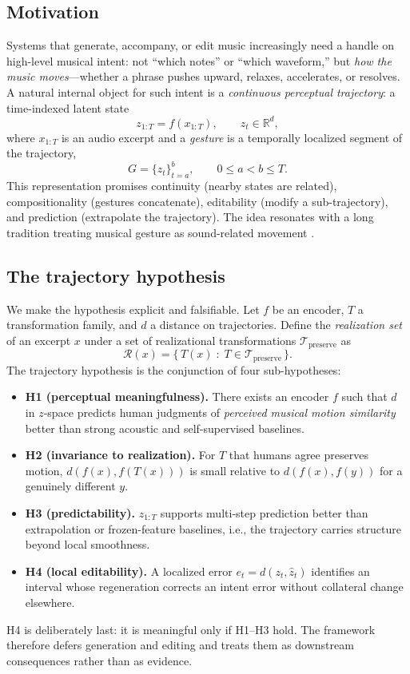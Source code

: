 \documentclass[11pt]{article}
\newcommand{\R}{\mathbb{R}}
\newcommand{\cT}{\mathcal{T}}
\newcommand{\cR}{\mathcal{R}}
\begin{document}
\subsection{Motivation}
Systems that generate, accompany, or edit music increasingly need a handle on
high-level musical intent: not ``which notes'' or ``which waveform,'' but
\emph{how the music moves}---whether a phrase pushes upward, relaxes, accelerates,
or resolves. A natural internal object for such intent is a \emph{continuous
perceptual trajectory}: a time-indexed latent state
\begin{equation}
z_{1:T} = f(x_{1:T}), \qquad z_t \in \R^d,
\end{equation}
where $x_{1:T}$ is an audio excerpt and a \emph{gesture} is a temporally localized
segment of the trajectory,
\begin{equation}
G = \{z_t\}_{t=a}^{b}, \qquad 0 \le a < b \le T .
\end{equation}
This representation promises continuity (nearby states are related),
compositionality (gestures concatenate), editability (modify a sub-trajectory),
and prediction (extrapolate the trajectory). The idea resonates with a long
tradition treating musical gesture as sound-related movement
\citep{godoy2010gestures,meyer1956emotion}.

\subsection{The trajectory hypothesis}
We make the hypothesis explicit and falsifiable. Let $f$ be an encoder, $T$ a
transformation family, and $d$ a distance on trajectories. Define the
\emph{realization set} of an excerpt $x$ under a set of realizational
transformations $\cT_{\text{preserve}}$ as
\begin{equation}
\cR(x) = \{\, T(x) \;:\; T \in \cT_{\text{preserve}} \,\}.
\end{equation}
The trajectory hypothesis is the conjunction of four sub-hypotheses:
\begin{itemize}
  \item \textbf{H1 (perceptual meaningfulness).} There exists an encoder $f$ such
  that $d$ in $z$-space predicts human judgments of \emph{perceived musical motion
  similarity} better than strong acoustic and self-supervised baselines.
  \item \textbf{H2 (invariance to realization).} For $T$ that humans agree
  preserves motion, $d(f(x), f(T(x)))$ is small relative to $d(f(x), f(y))$ for a
  genuinely different $y$.
  \item \textbf{H3 (predictability).} $z_{1:T}$ supports multi-step prediction
  better than extrapolation or frozen-feature baselines, i.e., the trajectory
  carries structure beyond local smoothness.
  \item \textbf{H4 (local editability).} A localized error
  $e_t = d(z_t, \hat z_t)$ identifies an interval whose regeneration corrects an
  intent error without collateral change elsewhere.
\end{itemize}
H4 is deliberately last: it is meaningful only if H1--H3 hold. The framework
therefore defers generation and editing and treats them as downstream
consequences rather than as evidence.
\end{document}
